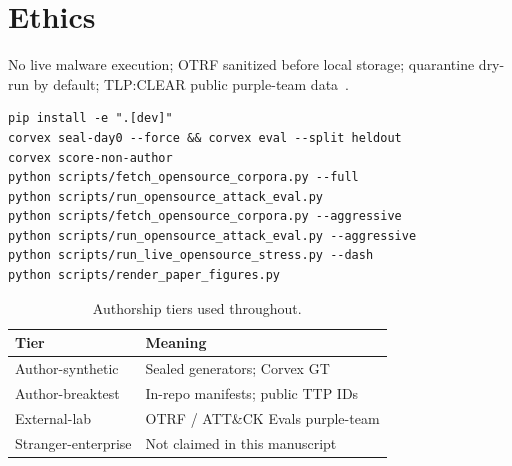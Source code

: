 \documentclass[conference,compsoc]{IEEEtran}
\begin{document}
\section*{Ethics}
No live malware execution; OTRF sanitized before local storage; quarantine
dry-run by default; TLP:CLEAR public purple-team data~\cite{first_tlp}.




\appendix[Reproduce]
\label{app:repro}
\begin{footnotesize}
\begin{verbatim}
pip install -e ".[dev]"
corvex seal-day0 --force && corvex eval --split heldout
corvex score-non-author
python scripts/fetch_opensource_corpora.py --full
python scripts/run_opensource_attack_eval.py
python scripts/fetch_opensource_corpora.py --aggressive
python scripts/run_opensource_attack_eval.py --aggressive
python scripts/run_live_opensource_stress.py --dash
python scripts/render_paper_figures.py
\end{verbatim}
\end{footnotesize}

\label{app:tiers}
\begin{table}[!h]
\caption{Authorship tiers used throughout.}
\label{tab:tiers}
\centering
\scriptsize
\begin{tabular}{@{}lp{2.2in}@{}}
\toprule
Tier & Meaning \\
\midrule
Author-synthetic & Sealed generators; Corvex GT \\
Author-breaktest & In-repo manifests; public TTP IDs \\
External-lab & OTRF / ATT\&CK Evals purple-team \\
Stranger-enterprise & Not claimed in this manuscript \\
\bottomrule
\end{tabular}
\end{table}

\balance
\end{document}
